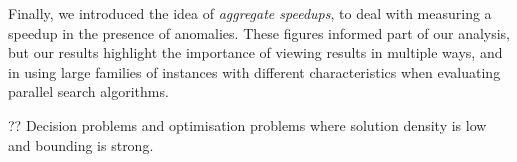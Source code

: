 \documentclass{llncs}
\begin{document}
Finally, we introduced the idea of \emph{aggregate speedups}, to deal with measuring a speedup in
the presence of anomalies. These figures informed part of our analysis, but our results highlight
the importance of viewing results in multiple ways, and in using large families of instances with
different characteristics when evaluating parallel search algorithms.

?? Decision problems and optimisation problems where solution density is low and bounding is strong.



\end{document}
